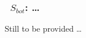 \vsssub
\subsubsection{~$S_{bot}$: \ldots} \label{sec:BT3}
\vsssub


\noindent
Still to be provided \ldots
